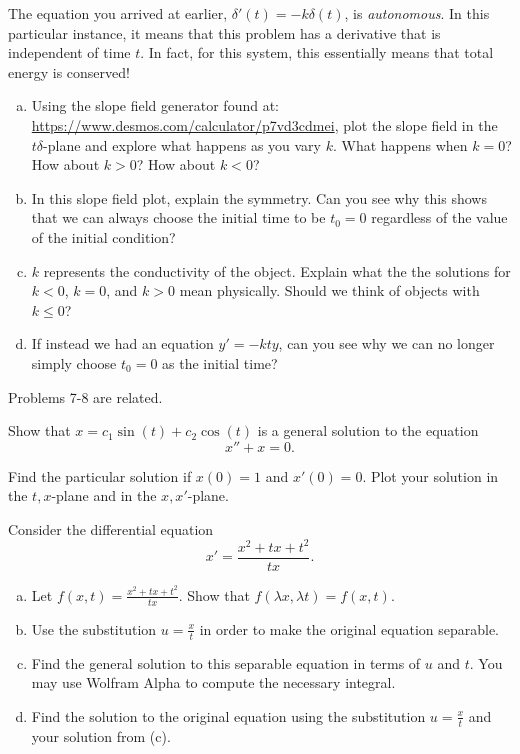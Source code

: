 \documentclass[12pt]{article} %
\begin{document}
\begin{problem}
    The equation you arrived at earlier, $\delta'(t) = -k\delta(t)$, is \emph{autonomous}.  In this particular instance, it means that this problem has a derivative that is independent of time $t$.  In fact, for this system, this essentially means that total energy is conserved! 
    \begin{enumerate}[(a)]
        \item Using the slope field generator found at: \url{https://www.desmos.com/calculator/p7vd3cdmei}, plot the slope field in the $t\delta$-plane and explore what happens as you vary $k$. What happens when $k=0$? How about $k>0$? How about $k<0$? 
        \item In this slope field plot, explain the symmetry.  Can you see why this shows that we can always choose the initial time to be $t_0=0$ regardless of the value of the initial condition? 
        \item $k$ represents the conductivity of the object.  Explain what the the solutions for $k<0$, $k=0$, and $k>0$ mean physically. Should we think of objects with $k\leq 0$?
        \item If instead we had an equation $y'=-kty$, can you see why we can no longer simply choose $t_0=0$ as the initial time?
    \end{enumerate}
\end{problem}  

\begin{center}
    Problems 7-8 are related.
\end{center}
\begin{problem}
    Show that $x=c_1\sin(t)+c_2\cos(t)$ is a general solution to the equation
    \[
        x''+x=0.
    \]
\end{problem}

\begin{problem}
    Find the particular solution if $x(0)=1$ and $x'(0)=0$. Plot your solution in the $t,x$-plane and in the $x,x'$-plane. 
\end{problem}

\begin{problem}
    Consider the differential equation
    \[
    x'=\frac{x^2+tx+t^2}{tx}.
    \]
    \begin{enumerate}[(a)]
        \item Let $f(x,t)=\frac{x^2+tx+t^2}{tx}$.  Show that $f(\lambda x, \lambda t)=f(x,t)$.
        \item Use the substitution $u=\frac{x}{t}$ in order to make the original equation separable.
        \item Find the general solution to this separable equation in terms of $u$ and $t$. You may use Wolfram Alpha to compute the necessary integral.
        \item Find the solution to the original equation using the substitution $u=\frac{x}{t}$ and your solution from (c).
    \end{enumerate}
\end{problem}
\end{document}
